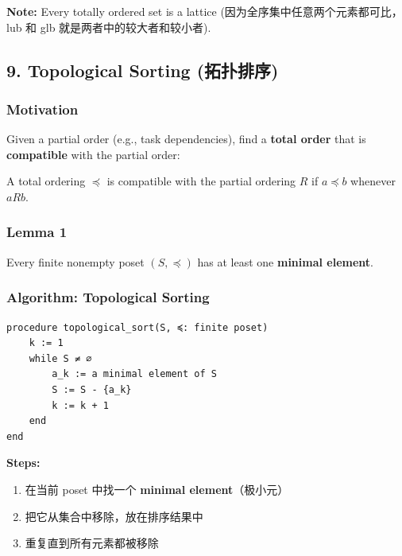 \documentclass[10pt,a4paper,openany]{ctexbook}
\theoremstyle{definition}
\theoremstyle{remark}
\renewenvironment{quote}
  {\list{}{\leftmargin=1em\rightmargin=0pt\topsep=0.5pt\partopsep=0pt}\item[]}
  {\endlist}
\begin{document}
\begin{quote}
\textbf{Note:} Every totally ordered set is a lattice (因为全序集中任意两个元素都可比，lub 和 glb 就是两者中的较大者和较小者).

\end{quote}
\vspace{-2pt}

\subsection{9. Topological Sorting (拓扑排序)}

\subsubsection{Motivation}

Given a partial order (e.g., task dependencies), find a \textbf{total order} that is \textbf{compatible} with the partial order:
\begin{quote}
A total ordering $\preccurlyeq$ is compatible with the partial ordering $R$ if $a \preccurlyeq b$ whenever $a R b$.

\end{quote}

\subsubsection{Lemma 1}

\begin{quote}
Every finite nonempty poset $(S, \preccurlyeq)$ has at least one \textbf{minimal element}.

\end{quote}

\subsubsection{Algorithm: Topological Sorting}

{\footnotesize\begin{verbatim}
procedure topological_sort(S, ≼: finite poset)
    k := 1
    while S ≠ ∅
        a_k := a minimal element of S
        S := S - {a_k}
        k := k + 1
    end
end
\end{verbatim}}

\textbf{Steps:}
\begin{enumerate}
\item 在当前 poset 中找一个 \textbf{minimal element}（极小元）
\item 把它从集合中移除，放在排序结果中
\item 重复直到所有元素都被移除

\end{enumerate}
\end{document}
